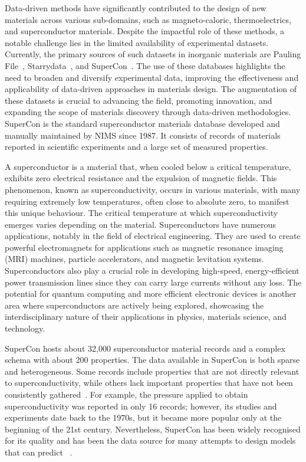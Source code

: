 Data-driven methods have significantly contributed to the design of new materials across various sub-domains, such as magneto-caloric, thermoelectrics, and superconductor materials. Despite the impactful role of these methods, a notable challenge lies in the limited availability of experimental datasets. 
Currently, the primary sources of such datasets in inorganic materials are Pauling File~\cite{Blokhin2018ThePF_paulingFile}, Starrydata~\cite{katsura2019data}, and SuperCon~\cite{ishii2023structuring}. 
The use of these databases highlights the need to broaden and diversify experimental data, improving the effectiveness and applicability of data-driven approaches in materials design. 
The augmentation of these datasets is crucial to advancing the field, promoting innovation, and expanding the scope of materials discovery through data-driven methodologies.
SuperCon is the standard superconductor materials database developed and manually maintained by NIMS since 1987. 
It consists of records of materials reported in scientific experiments and a large set of measured properties. 

A superconductor is a material that, when cooled below a critical temperature, exhibits zero electrical resistance and the expulsion of magnetic fields. This phenomenon, known as superconductivity, occurs in various materials, with many requiring extremely low temperatures, often close to absolute zero, to manifest this unique behaviour. The critical temperature at which superconductivity emerges varies depending on the material. 
Superconductors have numerous applications, notably in the field of electrical engineering. They are used to create powerful electromagnets for applications such as magnetic resonance imaging (MRI) machines, particle accelerators, and magnetic levitation systems. 
Superconductors also play a crucial role in developing high-speed, energy-efficient power transmission lines since they can carry large currents without any loss. The potential for quantum computing and more efficient electronic devices is another area where superconductors are actively being explored, showcasing the interdisciplinary nature of their applications in physics, materials science, and technology.

SuperCon hosts about 32,000 superconductor material records and a complex schema with about 200 properties. 
The data available in SuperCon is both sparse and heterogeneous. Some records include properties that are not directly relevant to superconductivity, while others lack important properties that have not been consistently gathered~\cite{sommer20223dsc}.
For example, the pressure applied to obtain superconductivity was reported in only 16 records; however, its studies and experiments date back to the 1970s, but it became more popular only at the beginning of the 21st century.  
Nevertheless, SuperCon has been widely recognised for its quality and has been the data source for many attempts to design models that can predict \tc~\cite{stanev2017machine, le2020critical, Hamlin2019SuperconductivityNR}. 

